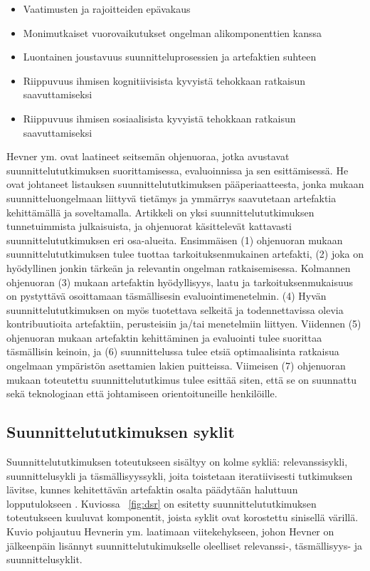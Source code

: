 \documentclass[utf8]{gradu3}
\begin{document}
\begin{itemize}
  \item Vaatimusten ja rajoitteiden epävakaus
  \item Monimutkaiset vuorovaikutukset ongelman alikomponenttien kanssa
  \item Luontainen joustavuus suunnitteluprosessien ja artefaktien suhteen
  \item Riippuvuus ihmisen kognitiivisista kyvyistä tehokkaan ratkaisun saavuttamiseksi
  \item Riippuvuus ihmisen sosiaalisista kyvyistä tehokkaan ratkaisun saavuttamiseksi
\end{itemize}

Hevner ym. \parencite*{hevner2004} ovat laatineet seitsemän ohjenuoraa, jotka avustavat suunnittelututkimuksen suorittamisessa, evaluoinnissa ja sen esittämisessä.  He ovat johtaneet listauksen suunnittelututkimuksen pääperiaatteesta, jonka mukaan suunnitteluongelmaan liittyvä tietämys ja ymmärrys saavutetaan artefaktia kehittämällä ja soveltamalla. Artikkeli on yksi suunnittelututkimuksen tunnetuimmista julkaisuista, ja ohjenuorat käsittelevät kattavasti suunnittelututkimuksen eri osa-alueita.  Ensimmäisen (1) ohjenuoran mukaan suunnittelututkimuksen tulee tuottaa tarkoituksenmukainen artefakti, (2) joka on hyödyllinen jonkin tärkeän ja relevantin ongelman ratkaisemisessa. Kolmannen ohjenuoran (3) mukaan artefaktin hyödyllisyys, laatu ja tarkoituksenmukaisuus on pystyttävä osoittamaan täsmällisesin evaluointimenetelmin. (4) Hyvän suunnittelututkimuksen on myös tuotettava selkeitä ja todennettavissa olevia kontribuutioita artefaktiin, perusteisiin ja/tai menetelmiin liittyen. Viidennen (5) ohjenuoran mukaan artefaktin kehittäminen ja evaluointi tulee suorittaa täsmällisin keinoin, ja (6) suunnittelussa tulee etsiä optimaalisinta ratkaisua ongelmaan ympäristön asettamien lakien puitteissa. Viimeisen (7) ohjenuoran mukaan toteutettu suunnittelututkimus tulee esittää siten, että se on suunnattu sekä teknologiaan että johtamiseen orientoituneille henkilöille.

%

\subsection{Suunnittelututkimuksen syklit}
\label{cycless} 

Suunnittelututkimuksen toteutukseen sisältyy on kolme sykliä: relevanssisykli, suunnittelusykli ja täsmällisyyssykli, joita toistetaan iteratiivisesti tutkimuksen lävitse, kunnes kehitettävän artefaktin osalta päädytään haluttuun lopputulokseen \parencite{cycles}. Kuviossa ~\ref{fig:dsr} on esitetty suunnittelututkimuksen toteutukseen kuuluvat komponentit, joista syklit ovat korostettu sinisellä värillä. Kuvio pohjautuu Hevnerin ym. \parencite*{hevner2004} laatimaan viitekehykseen, johon Hevner \parencite*{cycles} on jälkeenpäin lisännyt suunnittelutukimukselle oleelliset relevanssi-, täsmällisyys- ja suunnittelusyklit.
\end{document}
